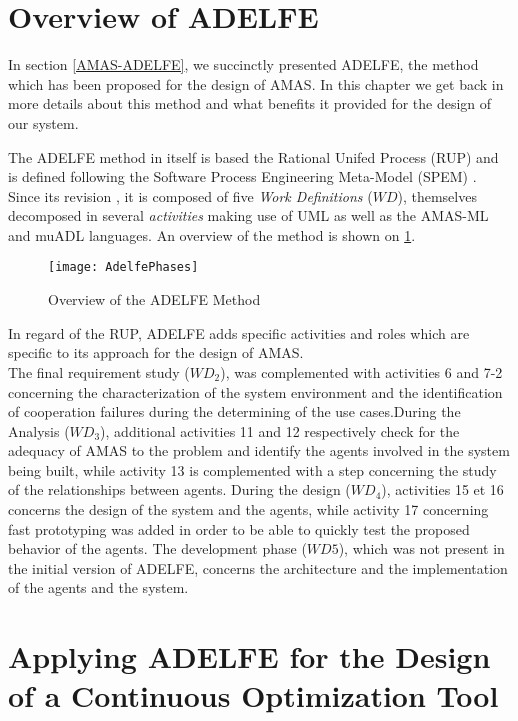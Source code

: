 \section{Overview of ADELFE}

In section \ref{AMAS-ADELFE}, we succinctly presented ADELFE, the method which has been proposed for the design of AMAS. In this chapter we get back in more details about this method and what benefits it provided for the design of our system. 

The ADELFE method in itself is based the Rational Unifed Process (RUP) and is defined following the Software Process Engineering Meta-Model (SPEM)  \cite{bernon2003adelfe,picard04phdthesis}. Since its revision \cite{Ro2008.3}, it is composed of five \emph{Work Definitions} ($WD$), themselves decomposed in several \emph{activities} making use of UML as well as the AMAS-ML and muADL languages. An overview of the method is shown on \figurename{} \ref{ADELFE_phases}.

\begin{figure}
\texttt{[image: AdelfePhases]}
\caption{Overview of the ADELFE Method}\label{ADELFE_phases}
\end{figure}

In regard of the RUP, ADELFE adds specific activities and roles which are specific to its approach for the design of AMAS.\\
The final requirement study ($WD_2$), was complemented with activities 6 and 7-2 concerning the characterization of the system environment and the identification of cooperation failures during the determining of the use cases.During the Analysis ($WD_3$), additional activities 11 and 12 respectively check for the adequacy of AMAS to the problem and identify the agents involved in the system being built, while activity 13 is complemented with a step concerning the study of the relationships between agents. During the design ($WD_4$), activities 15 et 16 concerns the design of the system and the agents, while activity 17 concerning fast prototyping was added in order to be able to quickly test the proposed behavior of the agents. The development phase ($WD5$), which was not present in the initial version of ADELFE, concerns the architecture and the implementation of the agents and the system.

\section{Applying ADELFE for the Design of a Continuous Optimization Tool}

